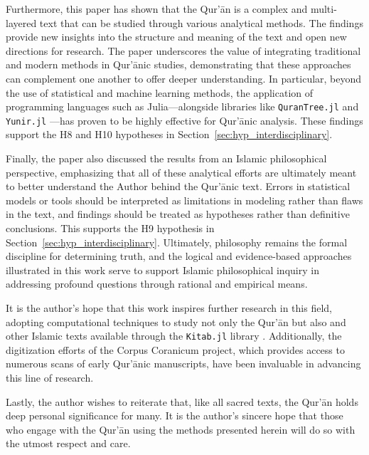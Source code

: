 Furthermore, this paper has shown that the Qur'\=an is a complex and multi-layered text that can be studied through various analytical methods. The findings provide new insights into the structure and meaning of the text and open new directions for research. The paper underscores the value of integrating traditional and modern methods in Qur'\=anic studies, demonstrating that these approaches can complement one another to offer deeper understanding. In particular, beyond the use of statistical and machine learning methods, the application of programming languages such as Julia—alongside libraries like \texttt{QuranTree.jl} \cite{asaad2021qurantree} and \texttt{Yunir.jl} \cite{al_ahmadgaid_b_asaad_yunir}—has proven to be highly effective for Qur'\=anic analysis. These findings support the H8 and H10 hypotheses in Section~\ref{sec:hyp_interdisciplinary}.

Finally, the paper also discussed the results from an Islamic philosophical perspective, emphasizing that all of these analytical efforts are ultimately meant to better understand the Author behind the Qur'\=anic text. Errors in statistical models or tools should be interpreted as limitations in modeling rather than flaws in the text, and findings should be treated as hypotheses rather than definitive conclusions. This supports the H9 hypothesis in Section~\ref{sec:hyp_interdisciplinary}. Ultimately, philosophy remains the formal discipline for determining truth, and the logical and evidence-based approaches illustrated in this work serve to support Islamic philosophical inquiry in addressing profound questions through rational and empirical means.

It is the author's hope that this work inspires further research in this field, adopting computational techniques to study not only the Qur'\=an but also   and other Islamic texts available through the \texttt{Kitab.jl} library \cite{al_ahmadgaid_b_asaad_kitab}. Additionally, the digitization efforts of the Corpus Coranicum project, which provides access to numerous scans of early Qur'\=anic manuscripts, have been invaluable in advancing this line of research.

Lastly, the author wishes to reiterate that, like all sacred texts, the Qur'\=an holds deep personal significance for many. It is the author's sincere hope that those who engage with the Qur'\=an using the methods presented herein will do so with the utmost respect and care.
